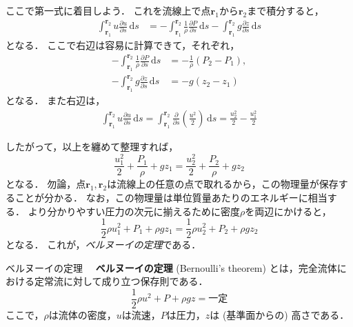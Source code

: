 \documentclass[uplatex,dvipdfmx,a4j,11pt]{jsreport}
\newcommand{\keyword}[1]{\textcolor{mainblue}{\textbf{#1}}}
\newcommand{\diff}{\mathrm{d}} %
\numberwithin{equation}{chapter}
\begin{document}
ここで第一式に着目しよう．
これを流線上で点$\mathbf{r}_1$から$\mathbf{r}_2$まで積分すると，
\begin{align*}
  \int_{\mathbf{r}_1}^{\mathbf{r}_2} u \frac{\partial u}{\partial s} \, \diff s &= -\int_{\mathbf{r}_1}^{\mathbf{r}_2} \frac{1}{\rho} \frac{\partial P}{\partial s} \, \diff s - \int_{\mathbf{r}_1}^{\mathbf{r}_2} g \frac{\partial z}{\partial s} \,\diff s
\end{align*}
となる．
ここで右辺は容易に計算できて，それぞれ，
\begin{align*}
  -\int_{\mathbf{r}_1}^{\mathbf{r}_2} \frac{1}{\rho} \frac{\partial P}{\partial s} \, \diff s &= -\frac{1}{\rho}(P_2 - P_1),\\
  -\int_{\mathbf{r}_1}^{\mathbf{r}_2} g \frac{\partial z}{\partial s} \,\diff s &= -g(z_2 - z_1)
\end{align*}
となる．
また右辺は，
\begin{align*}
  \int_{\mathbf{r}_1}^{\mathbf{r}_2} u \frac{\partial u}{\partial s} \, \diff s 
  = \int_{\mathbf{r}_1}^{\mathbf{r}_2} \frac{\partial}{\partial s}\left(\frac{u^2}{2}\right) \, \diff s
  = \frac{u_2^2}{2} - \frac{u_1^2}{2}
\end{align*}

したがって，以上を纏めて整理すれば，
\begin{equation}
  \frac{u_1^2}{2} + \frac{P_1}{\rho} + gz_1 = \frac{u_2^2}{2} + \frac{P_2}{\rho} + gz_2
\end{equation}
となる．
勿論，点$\mathbf{r}_1, \mathbf{r}_2$は流線上の任意の点で取れるから，この物理量が保存することが分かる．
なお，この物理量は単位質量あたりのエネルギーに相当する．
より分かりやすい圧力の次元に揃えるために密度$\rho$を両辺にかけると，
\begin{equation}
  \frac{1}{2}\rho u_1^2 + P_1 + \rho gz_1 = \frac{1}{2}\rho u_2^2 + P_2 + \rho gz_2 
  \label{eq:bernoulli_equation}
\end{equation}
となる．
これが，\emph{ベルヌーイの定理}である．

\begin{definition}{ベルヌーイの定理}{}{}
  　\keyword{ベルヌーイの定理} (Bernoulli's theorem) とは，完全流体における定常流に対して成り立つ保存則である．
  \begin{equation}
    \frac{1}{2}\rho u^2 + P + \rho gz = \text{一定}
  \end{equation}
  ここで，$\rho$は流体の密度，$u$は流速，$P$は圧力，$z$は (基準面からの) 高さである． 
\end{definition}
\end{document}

